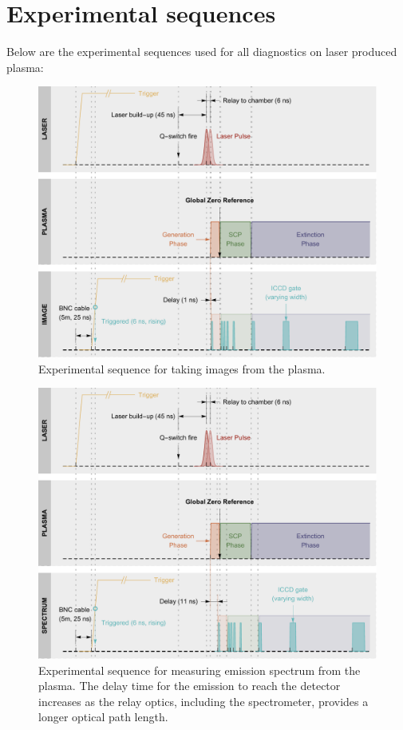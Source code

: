 
\chapter{Experimental sequences}
\label{sec:ap4}

Below are the experimental sequences used for all diagnostics on laser produced plasma:

\begin{figure}[ht!]
\centering
\includegraphics[width=130mm]{figures/ap4/sequence/imgSequence.pdf}
\caption{Experimental sequence for taking images from the plasma.}
\label{fig:imgSequence}
\end{figure}

\begin{figure}[ht!]
\centering
\includegraphics[width=130mm]{figures/ap4/sequence/specSequence.pdf}
\caption{Experimental sequence for measuring emission spectrum from the plasma. The delay time for the emission to reach the detector increases as the relay optics, including the spectrometer, provides a longer optical path length.}
\label{fig:specSequence}
\end{figure}


